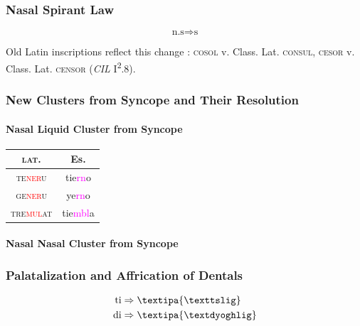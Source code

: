 \documentclass{report}[12pt]
\begin{document}
\subsubsection*{Nasal Spirant Law}

\begin{tcolorbox}
  \[ \text{n.s} \Rightarrow \text{s} \]
\end{tcolorbox}

Old Latin inscriptions reflect this change \parencite[p.~17]{companion_to_latin}: \textsc{cosol} v. Class. Lat. \textsc{consul}, \textsc{cesor} v. Class. Lat. \textsc{censor} (\emph{CIL} I\textsuperscript{2}.8).

\subsubsection*{New Clusters from Syncope and Their Resolution}

\paragraph*{Nasal Liquid Cluster from Syncope}

\begin{center}
\begin{tabular}{c c}
  \textsc{lat.} & Es. \\
  \hline
  \textsc{te\textcolor{red}{ner}u} & tie\textcolor{magenta}{rn}o \\
  \textsc{ge\textcolor{red}{ner}u} & ye\textcolor{magenta}{rn}o \\
  \textsc{tre\textcolor{red}{mul}at} & tie\textcolor{magenta}{mbl}a \\
\end{tabular}
\end{center}

\paragraph*{Nasal Nasal Cluster from Syncope}

\subsubsection*{Palatalization and Affrication of Dentals}\label{sec:dental_palatalization}

\begin{tcolorbox}
  \begin{align*}
    \text{ti} & \Rightarrow \text{\textipa{\texttslig}} \\
    \text{di} & \Rightarrow \text{\textipa{\textdyoghlig}} \\
  \end{align*}
\end{tcolorbox}
\end{document}
